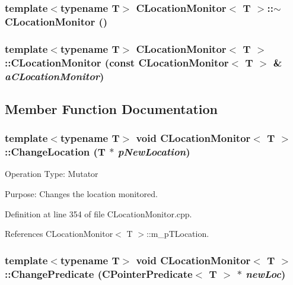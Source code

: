 \subsubsection{\setlength{\rightskip}{0pt plus 5cm}template$<$typename T$>$ CLocation\-Monitor$<$ T $>$::$\sim$CLocation\-Monitor ()\hspace{0.3cm}{\tt  [inline]}}\label{classCLocationMonitor_a3}


\subsubsection{\setlength{\rightskip}{0pt plus 5cm}template$<$typename T$>$ CLocation\-Monitor$<$ T $>$::CLocation\-Monitor (const CLocation\-Monitor$<$ T $>$ \& {\em a\-CLocation\-Monitor})\hspace{0.3cm}{\tt  [private]}}\label{classCLocationMonitor_c0}




\subsection{Member Function Documentation}
\subsubsection{\setlength{\rightskip}{0pt plus 5cm}template$<$typename T$>$ void CLocation\-Monitor$<$ T $>$::Change\-Location (T $\ast$ {\em p\-New\-Location})}\label{classCLocationMonitor_a8}


Operation Type: Mutator

Purpose: Changes the location monitored. 

Definition at line 354 of file CLocation\-Monitor.cpp.

References CLocation\-Monitor$<$ T $>$::m\_\-p\-TLocation.
\subsubsection{\setlength{\rightskip}{0pt plus 5cm}template$<$typename T$>$ void CLocation\-Monitor$<$ T $>$::Change\-Predicate ({\bf CPointer\-Predicate}$<$ T $>$ $\ast$ {\em new\-Loc})}\label{classCLocationMonitor_a9}


